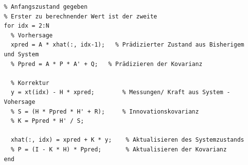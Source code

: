 \begin{lstlisting}
% Anfangszustand gegeben
% Erster zu berechnender Wert ist der zweite
for idx = 2:N
  % Vorhersage
  xpred = A * xhat(:, idx-1);   % Prädizierter Zustand aus Bisherigem und System
  % Ppred = A * P * A' + Q;   % Prädizieren der Kovarianz

  % Korrektur
  y = xt(idx) - H * xpred;        % Messungen/ Kraft aus System - Vohersage
  % S = (H * Ppred * H' + R);     % Innovationskovarianz
  % K = Ppred * H' / S;           

  xhat(:, idx) = xpred + K * y;    % Aktualisieren des Systemzustands
  % P = (I - K * H) * Ppred;       % Aktualisieren der Kovarianz
end
\end{lstlisting}






